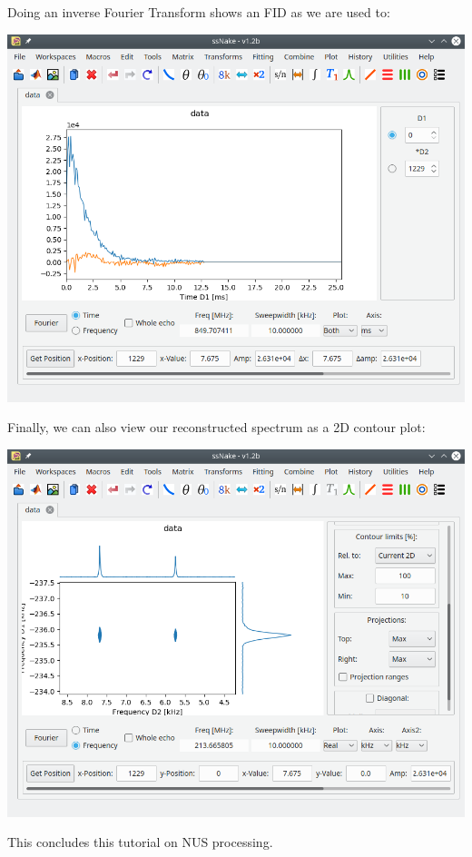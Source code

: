 \documentclass[11pt,a4paper]{article}
\begin{document}
Doing an inverse Fourier Transform shows an FID as we are used to:
\begin{center}
\includegraphics[width=0.8\linewidth]{Figs/Fig9.png}
\end{center}
Finally, we can also view our reconstructed spectrum as a 2D contour plot:
\begin{center}
\includegraphics[width=0.8\linewidth]{Figs/Fig10.png}
\end{center}
This concludes this tutorial on NUS processing.
\end{document}

